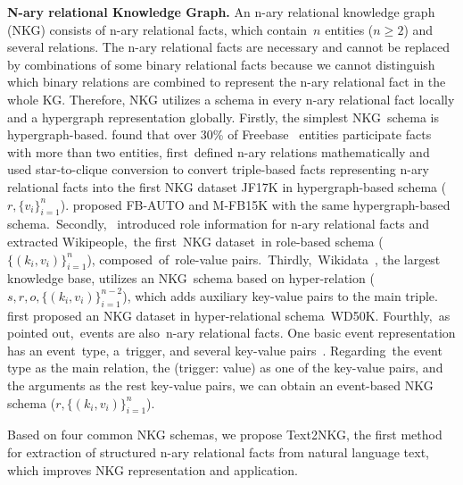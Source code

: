 \documentclass{article} \usepackage{iclr2024_conference,times}
\begin{document}
\textbf{N-ary relational Knowledge Graph. }
An n-ary relational knowledge graph (NKG) consists of n-ary relational facts, which contain $n$ entities ($n\geq 2$) and several relations. The n-ary relational facts are necessary and cannot be replaced by combinations of some binary relational facts because we cannot distinguish which binary relations are combined to represent the n-ary relational fact in the whole KG. Therefore, NKG utilizes a schema in every n-ary relational fact locally and a hypergraph representation globally. 
Firstly, the simplest NKG schema is hypergraph-based. \cite{m-TransH} found that over 30\% of Freebase~\citep{Freebase} entities participate facts with more than two entities, first defined n-ary relations mathematically and used star-to-clique conversion to convert triple-based facts representing n-ary relational facts into the first NKG dataset JF17K in hypergraph-based schema ($r,\{v_i\}_{i=1}^{n}$). \cite{HypE} proposed FB-AUTO and M-FB15K with the same hypergraph-based schema. Secondly, \cite{NaLP} introduced role information for n-ary relational facts and extracted Wikipeople, the first NKG dataset in role-based schema ($\{(k_i, v_i)\}_{i =1}^{n}$), composed of role-value pairs. Thirdly, Wikidata~\citep{Wikidata}, the largest knowledge base, utilizes an NKG schema based on hyper-relation ($ s, r, o, \{(k_i, v_i)\}_{i=1}^{n-2}$), which adds auxiliary key-value pairs to the main triple. \cite{StarE} first proposed an NKG dataset in hyper-relational schema WD50K. Fourthly, as \cite{EventSurvey} pointed out, events are also n-ary relational facts. One basic event representation has an event type, a trigger, and several key-value pairs~\citep{Text2Event}. Regarding the event type as the main relation, the (trigger: value) as one of the key-value pairs, and the arguments as the rest key-value pairs, we can obtain an event-based NKG schema ($r,\{(k_i, v_i)\}_{i=1}^{n}$).

Based on four common NKG schemas, we propose Text2NKG, the first method for extraction of structured n-ary relational facts from natural language text, which improves NKG representation and application.
\end{document}
